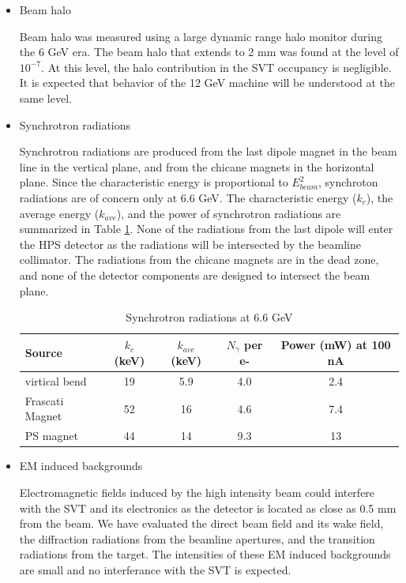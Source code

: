 \begin{itemize}
\item
Beam halo

Beam halo was measured using a large dynamic range halo monitor during the 6 GeV era. The beam halo 
that extends to 2 mm was found at the level of $10^{-7}$. At this level, the halo contribution in 
the SVT occupancy is negligible. It is expected that behavior of the 12 GeV machine will be
understood at the same level.

\item
Synchrotron radiations

Synchrotron radiations are produced from the last dipole magnet in the beam line in the vertical 
plane, and from the chicane magnets in the horizontal plane. Since the characteristic energy is 
proportional to $E_{beam}^2$, synchroton radiations are of concern 
only at 6.6 GeV. The characteristic energy ($k_c$),
the average energy ($k_{ave}$), and the power of synchrotron radiations are summarized in 
Table \ref{tab:sync}.
None of the radiations from the last dipole will enter the HPS detector as the radiations will be intersected 
by the beamline collimator. The radiations from the chicane magnets are in the dead zone, and
none of the detector components are designed to intersect the beam plane.   

\begin{table}[h]
\begin{center}
\begin{tabular}{|l|c|c|c|c|} \hline
  Source & $k_c$ (keV) & $k_{ave}$ (keV) & $N_\gamma$ per e- & Power (mW) at 100 nA \\ \hline
  virtical bend & 19 & 5.9 & 4.0 & 2.4 \\ \hline
  Frascati Magnet & 52 & 16 & 4.6 & 7.4 \\ \hline
  PS magnet   & 44 & 14 & 9.3 & 13 \\ \hline
\end{tabular}
\end{center}
\caption{\small{Synchrotron radiations at 6.6 GeV}}
\label{tab:sync}
\end{table}


\item
EM induced backgrounds

Electromagnetic fields induced by the high intensity beam could interfere with the SVT and its electronics
as the detector is located as close as 0.5 mm from the beam. We have evaluated the direct beam field and its wake 
field, the diffraction radiations from the beamline apertures, and the transition radiations from
the target. The intensities of these EM induced backgrounds are small and no interferance with the SVT
is expected.
 
\end{itemize}

